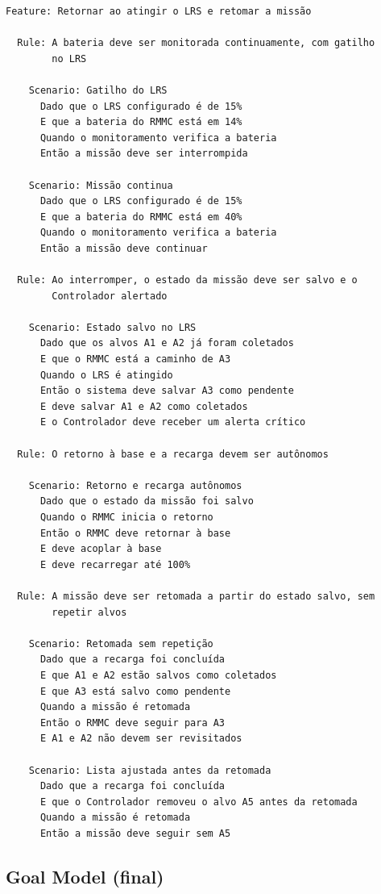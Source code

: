 \documentclass[a4paper, 12pt]{article}
\begin{document}
{\small
\begin{verbatim}
Feature: Retornar ao atingir o LRS e retomar a missão

  Rule: A bateria deve ser monitorada continuamente, com gatilho
        no LRS

    Scenario: Gatilho do LRS
      Dado que o LRS configurado é de 15%
      E que a bateria do RMMC está em 14%
      Quando o monitoramento verifica a bateria
      Então a missão deve ser interrompida

    Scenario: Missão continua
      Dado que o LRS configurado é de 15%
      E que a bateria do RMMC está em 40%
      Quando o monitoramento verifica a bateria
      Então a missão deve continuar

  Rule: Ao interromper, o estado da missão deve ser salvo e o
        Controlador alertado

    Scenario: Estado salvo no LRS
      Dado que os alvos A1 e A2 já foram coletados
      E que o RMMC está a caminho de A3
      Quando o LRS é atingido
      Então o sistema deve salvar A3 como pendente
      E deve salvar A1 e A2 como coletados
      E o Controlador deve receber um alerta crítico

  Rule: O retorno à base e a recarga devem ser autônomos

    Scenario: Retorno e recarga autônomos
      Dado que o estado da missão foi salvo
      Quando o RMMC inicia o retorno
      Então o RMMC deve retornar à base
      E deve acoplar à base
      E deve recarregar até 100%

  Rule: A missão deve ser retomada a partir do estado salvo, sem
        repetir alvos

    Scenario: Retomada sem repetição
      Dado que a recarga foi concluída
      E que A1 e A2 estão salvos como coletados
      E que A3 está salvo como pendente
      Quando a missão é retomada
      Então o RMMC deve seguir para A3
      E A1 e A2 não devem ser revisitados

    Scenario: Lista ajustada antes da retomada
      Dado que a recarga foi concluída
      E que o Controlador removeu o alvo A5 antes da retomada
      Quando a missão é retomada
      Então a missão deve seguir sem A5
\end{verbatim}
}


\subsection{Goal Model (final)}
\end{document}
